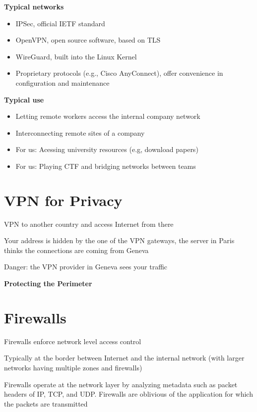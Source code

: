 \documentclass[11pt]{article}
\begin{document}
\textbf{Typical networks}
\begin{itemize}
	\item IPSec, official IETF standard
	\item OpenVPN, open source software, based on TLS
	\item WireGuard, built into the Linux Kernel
	\item Proprietary protocols (e.g., Cisco AnyConnect), offer convenience in configuration and maintenance
\end{itemize}

\textbf{Typical use}
\begin{itemize}
	\item Letting remote workers access the internal company network
	\item Interconnecting remote sites of a company
	\item For us: Acessing university resources (e.g, download papers)
	\item For us: Playing CTF and bridging networks between teams
\end{itemize}

\section*{VPN for Privacy}

VPN to another country and access Internet from there

Your address is hidden by the one of the VPN gateways, the server in Paris thinks the connections are coming from Geneva

Danger: the VPN provider in Geneva sees your traffic

\vspace{0.5cm}

\begin{center}
  {\LARGE \textbf{Protecting the Perimeter}}
\end{center}
\vspace{0.5cm}

\section*{Firewalls}

Firewalls enforce network level access control

Typically at the border between Internet and the internal network (with larger networks having multiple zones and firewalls)

Firewalls operate at the network layer by analyzing metadata such as packet headers of IP, TCP, and UDP. Firewalls are oblivious of the application for which the packets are transmitted
\end{document}
